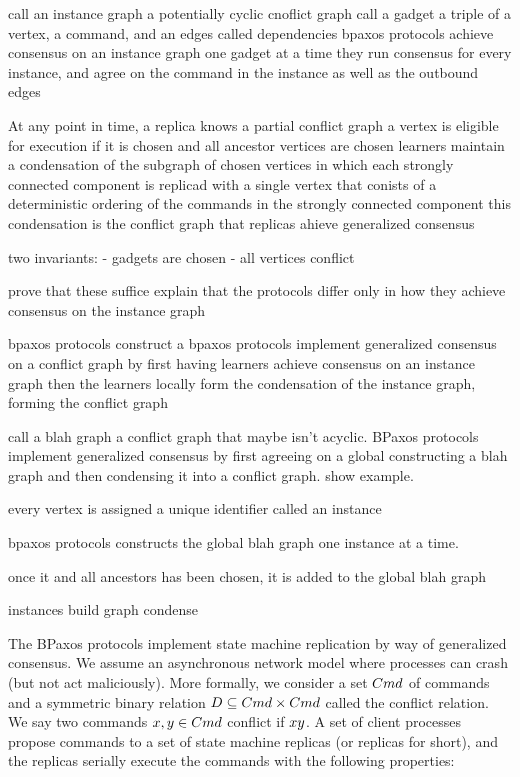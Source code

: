 call an instance graph a potentially cyclic cnoflict graph
call a gadget a triple of a vertex, a command, and an edges called dependencies
bpaxos protocols achieve consensus on an instance graph one gadget at a time
they run consensus for every instance, and agree on the command in the instance as well as the outbound edges

At any point in time, a replica knows a partial conflict graph
a vertex is eligible for execution if it is chosen and all ancestor vertices are chosen
learners maintain a condensation of the subgraph of chosen vertices in which each strongly connected component is replicad with a single vertex that conists of a deterministic ordering of the commands in the strongly connected component
this condensation is the conflict graph that replicas ahieve generalized consensus

two invariants:
  - gadgets are chosen
  - all vertices conflict

prove that these suffice
explain that the protocols differ only in how they achieve consensus on the instance graph

bpaxos protocols construct a
bpaxos protocols implement generalized consensus on a conflict graph by first having learners achieve consensus on an instance graph
then the learners locally form the condensation of the instance graph, forming the conflict graph

call a blah graph a conflict graph that maybe isn't acyclic.
BPaxos protocols implement generalized consensus by first agreeing on a global constructing a blah graph and then condensing it into a conflict graph.
show example.

every vertex is assigned a unique identifier called an instance

bpaxos protocols constructs the global blah graph one instance at a time.

once it and all ancestors has been chosen, it is added to the global blah graph

instances
build graph
condense


The BPaxos protocols implement state machine replication by way of generalized consensus. We assume an asynchronous network model where processes can crash (but not act maliciously). More formally, we consider a set $Cmd$ of commands and a symmetric binary relation $D \subseteq Cmd \times Cmd$ called the conflict relation. We say two commands $x, y \in Cmd$ conflict if $x  y$. A set of client processes propose commands to a set of state machine replicas (or replicas for short), and the replicas serially execute the commands with the following properties:

